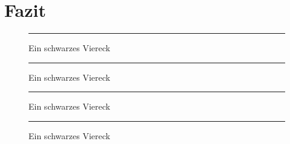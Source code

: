 \chapter{Fazit}

\begin{figure}[h]\centering
\rule{6cm}{4cm}
\caption{Ein schwarzes Viereck}
\end{figure}

\blindtext[10]

\blindtext[10]

\blindtext[10]

\blindtext[10]

\blindtext[10]



\blindtext[10]


\begin{figure}[h]\centering
\rule{6cm}{4cm}
\caption{Ein schwarzes Viereck}
\end{figure}

\blindtext[10]

\blindtext[10]

\blindtext[10]

\blindtext[10]

\blindtext[10]



\blindtext[10]


\begin{figure}[h]\centering
\rule{6cm}{4cm}
\caption{Ein schwarzes Viereck}
\end{figure}

\blindtext[10]

\blindtext[10]

\blindtext[10]

\blindtext[10]

\blindtext[10]



\blindtext[10]


\begin{figure}[h]\centering
\rule{6cm}{4cm}
\caption{Ein schwarzes Viereck}
\end{figure}

\blindtext[10]

\blindtext[10]

\blindtext[10]

\blindtext[10]

\blindtext[10]



\blindtext[10]


